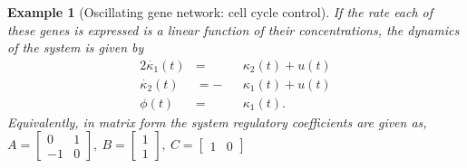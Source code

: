 \documentclass{article}
\newcommand{\1}{\mathbbm{1}}
\newtheorem{example}{Example}
\begin{document}
\begin{example}[Oscillating gene network: cell cycle control]
    If the rate each of these genes is expressed is a linear function of their concentrations, the dynamics of the system is given by
    \begin{alignat*}{2}
      \dot{\kappa_{1}}(t) &= &&\kappa_{2}(t) + u(t) \\
        \dot{\kappa_{2}}(t) &= - &&\kappa_{1}(t) + u(t) \\
        \phi(t) &= &&\kappa_{1}(t)   .
    \end{alignat*}
Equivalently, in matrix form the system regulatory coefficients are given as,
    $A \!=\! \left[\begin{smallmatrix} 0 & 1 \\ -1 & 0 \end{smallmatrix}\right] ,\ B \! =\! \left[\begin{smallmatrix} 1 \\ 1 \end{smallmatrix}\right] , \ C \! =\! \left[\begin{smallmatrix} 1 & 0 \end{smallmatrix}\right]$
      

\end{example}
\end{document}

